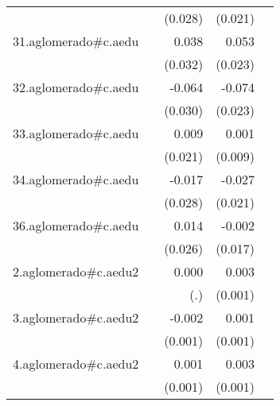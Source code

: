 {\begin{longtable}{l*{4}{D{.}{.}{-1}}}
            &                     &     (0.028)         &     (0.021)         &                     \\
\addlinespace
31.aglomerado#c.aedu&                     &       0.038         &       0.053\sym{*}  &                     \\
            &                     &     (0.032)         &     (0.023)         &                     \\
\addlinespace
32.aglomerado#c.aedu&                     &      -0.064\sym{*}  &      -0.074\sym{**} &                     \\
            &                     &     (0.030)         &     (0.023)         &                     \\
\addlinespace
33.aglomerado#c.aedu&                     &       0.009         &       0.001         &                     \\
            &                     &     (0.021)         &     (0.009)         &                     \\
\addlinespace
34.aglomerado#c.aedu&                     &      -0.017         &      -0.027         &                     \\
            &                     &     (0.028)         &     (0.021)         &                     \\
\addlinespace
36.aglomerado#c.aedu&                     &       0.014         &      -0.002         &                     \\
            &                     &     (0.026)         &     (0.017)         &                     \\
\addlinespace
2.aglomerado#c.aedu2&                     &       0.000         &       0.003\sym{***}&                     \\
            &                     &         (.)         &     (0.001)         &                     \\
\addlinespace
3.aglomerado#c.aedu2&                     &      -0.002         &       0.001         &                     \\
            &                     &     (0.001)         &     (0.001)         &                     \\
\addlinespace
4.aglomerado#c.aedu2&                     &       0.001         &       0.003\sym{***}&                     \\
            &                     &     (0.001)         &     (0.001)         &                     \\

\end{longtable}}
